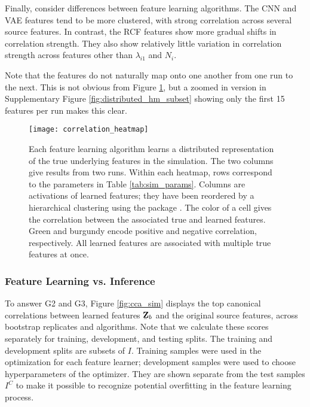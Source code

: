 Finally, consider differences between feature learning algorithms. The CNN and
VAE features tend to be more clustered, with strong correlation across several
source features. In contrast, the RCF features show more gradual shifts in
correlation strength. They also show relatively little variation in correlation
strength across features other than $\lambda_{i1}$ and $N_{i}$.

Note that the features do not naturally map onto one another from one run to the
next. This is not obvious from Figure \ref{fig:distributed_hm}, but a zoomed in
version in Supplementary Figure \ref{fig:distributed_hm_subset} showing only the
first 15 features per run makes this clear.

\begin{figure}
  \centering
  \texttt{[image: correlation\_heatmap]}
  \caption{Each feature learning algorithm learns a distributed
    representation of the true underlying features in the simulation. The two
    columns give results from two runs. Within each heatmap, rows correspond to
    the parameters in Table \ref{tab:sim_params}. Columns are activations of
    learned features; they have been reordered by a hierarchical clustering
    using the package \citep{barter2018superheat}. The color of a cell gives the
    correlation between the associated true and learned features. Green and
    burgundy encode positive and negative correlation, respectively. All learned
    features are associated with multiple true features at once.}
  \label{fig:distributed_hm}
\end{figure}

\subsubsection{Feature Learning vs. Inference}

To answer G2 and G3, Figure \ref{fig:cca_sim} displays the top canonical
correlations between learned features $\underaccent{\bar}{\mathbf{Z}}_{b}$ and
the original source features, across bootstrap replicates and algorithms. Note
that we calculate these scores separately for training, development, and testing
splits. The training and development splits are subsets of $I$. Training samples
were used in the optimization for each feature learner; development samples were
used to choose hyperparameters of the optimizer. They are shown separate from
the test samples $I^{C}$ to make it possible to recognize potential overfitting
in the feature learning process.

